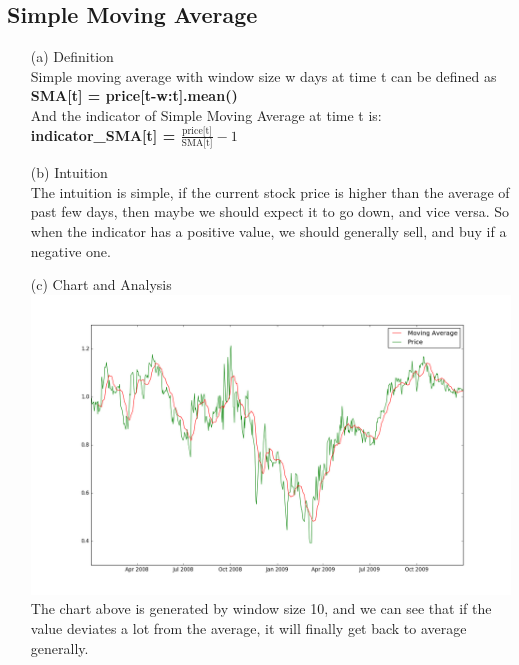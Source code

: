 \documentclass[a4paper]{article}
\begin{document}
\subsection{Simple Moving Average}
\begin{itemize}
	\item[(a)] Definition \\
			Simple moving average with window size w days at time t can be defined as \\
			\textbf{SMA[t] = price[t-w:t].mean()} \\
			And the indicator of Simple Moving Average at time t is: \\
			\textbf{indicator\_SMA[t] = $\frac{\text{price[t]}}{\text{SMA[t]}} - 1$}
	\item[(b)] Intuition \\
			The intuition is simple, if the current stock price is higher than the average of past
			few days, then maybe we should expect it to go down, and vice versa. So when
			the indicator has a positive value, we should generally sell, and buy if a
			negative one.
	\item[(c)] Chart and Analysis\\
		\includegraphics[width=\textwidth]{sma}
			The chart above is generated by window size 10, and we can see that if the value deviates
			a lot from the average, it will finally get back to average generally.


\end{itemize}
\end{document}
